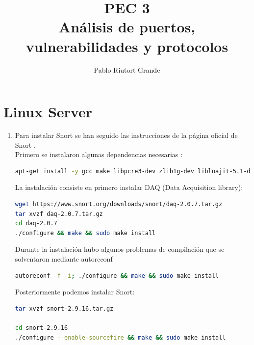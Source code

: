 \documentclass[10pt,a4paper]{article}
\author{Pablo Riutort Grande}
\title{PEC 3\\ \vspace{1cm}\textbf{Análisis de puertos, vulnerabilidades y protocolos}}
\begin{document}
\maketitle

\section*{Linux Server}
\begin{enumerate}[label=\textbf{\alph*)}]
\item Para instalar Snort se han seguido las instrucciones de la página oficial de Snort \cite{snort}.\\
Primero se instalaron algunas dependencias necesarias \cite{upcloud}:
\begin{lstlisting}[language=bash]
apt-get install -y gcc make libpcre3-dev zlib1g-dev libluajit-5.1-dev libpcap-dev openssl libssl-dev libnghttp2-dev libdumbnet-dev bison flex libdnet
\end{lstlisting}

La instalación consiste en primero instalar DAQ (Data Acquisition library):
\begin{lstlisting}[language=bash]
wget https://www.snort.org/downloads/snort/daq-2.0.7.tar.gz
tar xvzf daq-2.0.7.tar.gz
cd daq-2.0.7
./configure && make && sudo make install
\end{lstlisting}

Durante la instalación hubo algunos problemas de compilación que se solventaron mediante autoreconf
\begin{lstlisting}[language=bash]
autoreconf -f -i; ./configure && make && sudo make install
\end{lstlisting}

Posteriormente podemos instalar Snort:
\begin{lstlisting}[language=bash]
tar xvzf snort-2.9.16.tar.gz
                      
cd snort-2.9.16
./configure --enable-sourcefire && make && sudo make install
\end{lstlisting}


\end{enumerate}
\end{document}

